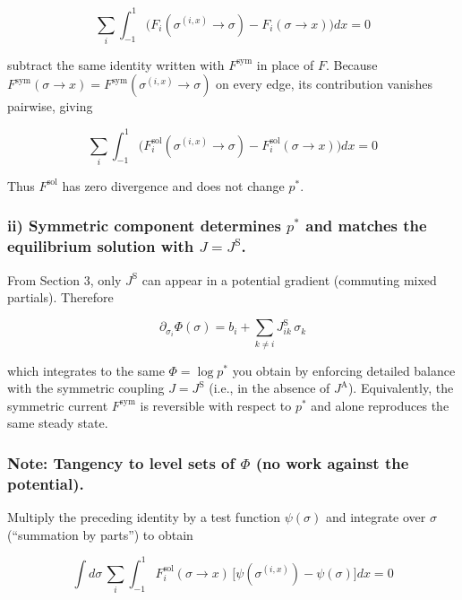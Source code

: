 \documentclass{article}
\begin{document}
\begin{equation}
\sum_i \int_{-1}^1 \Big(F_i(\sigma^{(i,x)}\to\sigma)-F_i(\sigma\to x)\Big) dx = 0
\end{equation}

subtract the same identity written with $F^{\mathrm{sym}}$ in place of $F$. Because $F^{\mathrm{sym}}(\sigma\to x)=F^{\mathrm{sym}}(\sigma^{(i,x)}\to\sigma)$ on every edge, its contribution vanishes pairwise, giving

\begin{equation}
\sum_i \int_{-1}^1 \Big(F_i^{\mathrm{sol}}(\sigma^{(i,x)}\to\sigma)-F_i^{\mathrm{sol}}(\sigma\to x)\Big) dx = 0
\end{equation}

Thus $F^{\mathrm{sol}}$ has zero divergence and does not change $p^\ast$.

\subsubsection{ii) Symmetric component determines $p^\ast$ and matches the equilibrium solution with $J=J^{\mathrm{S}}$.}

From Section 3, only $J^{\mathrm{S}}$ can appear in a potential gradient (commuting mixed partials). Therefore

\begin{equation}
\partial_{\sigma_i}\Phi(\sigma) = b_i + \sum_{k\neq i} J^{\mathrm{S}}_{ik}\,\sigma_k
\end{equation}

which integrates to the same $\Phi=\log p^\ast$ you obtain by enforcing detailed balance with the symmetric coupling $J=J^{\mathrm{S}}$ (i.e., in the absence of $J^{\mathrm{A}}$). Equivalently, the symmetric current $F^{\mathrm{sym}}$ is reversible with respect to $p^\ast$ and alone reproduces the same steady state.

\subsubsection{Note: Tangency to level sets of $\Phi$ (no work against the potential).}

Multiply the preceding identity by a test function $\psi(\sigma)$ and integrate over $\sigma$ (``summation by parts'') to obtain

\begin{equation}
\int d\sigma\, \sum_i\int_{-1}^1 F_i^{\mathrm{sol}}(\sigma\to x)\,\big[\psi(\sigma^{(i,x)})-\psi(\sigma)\big] dx = 0
\end{equation}
\end{document}
